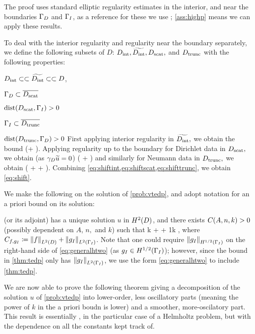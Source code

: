 The proof uses standard elliptic regularity estimates in the interior, and near the boundaries $\Gamma_{D}$ and $\Gamma_{I}$, as a reference for these we use \cite[pp. 137-138]{Mc:00}; \cref{ass:highp} means we can apply these results.

To deal with the interior regularity and regularity near the boundary separately, we define the following subsets of $D$: $D_{\mathrm{int}},\widetilde{D_{\mathrm{int}}},D_{\mathrm{scat}},$ and $D_{\mathrm{trunc}}$ with the following properties:
\bit
\item $D_{\mathrm{int}} \subset\subset \widetilde{D_{\mathrm{int}}} \subset\subset D$,
\item $\Gamma_{D} \subset \overline{D_{\mathrm{scat}}}$
\item $\operatorname{dist}(D_{\mathrm{scat}},\Gamma_{I}) > 0 $
  \item $\Gamma_{I} \subset \overline{D_{\mathrm{trunc}}}$
\item $\operatorname{dist}(D_{\mathrm{trunc}},\Gamma_{D}) > 0 $
    \eit
    First applying interior regularity \cite[Theorem 4.16]{Mc:00} in $\widetilde{D_{\mathrm{int}}},$ we obtain the bound
    \beq\label{eq:shiftint}
\NHlptDint{\utilde} \leq \CintAl \mleft(\NHoDinttilde + \NHlDinttilde{\ftilde}\mright).
\eeq
Applying regularity up to the boundary for Dirichlet data \cite[Theorem 4.18 (i)]{Mc:00} in $D_{\mathrm{scat}},$ we obtain (as $\gamma_{D} \widetilde{u} = 0$)
\beq\label{eq:shiftscat}
\NHlptDscat{\utilde} \leq \CscatAl \mleft(\NHoD{\utilde} + \NHlD{\ftilde}\mright)
\eeq
and similarly for Neumann data \cite[Theorem 4.18 (ii)]{Mc:00} in $D_{\mathrm{trunc}},$ we obtain
\beq\label{eq:shifttrunc}
\NHlptDtrunc{\utilde} \leq \CtruncAl \mleft(\NHoD{\utilde} + \NHlphGI{\dn \utilde} + \NHlD{\ftilde}\mright).
\eeq
Combining \cref{eq:shiftint,eq:shiftscat,eq:shifttrunc}, we obtain \cref{eq:shift}.
\epf

We make the following  on the solution of \cref{prob:vtedp}, and adopt notation for an a priori bound on its solution:

\bas\label{ass:htwo}
 (or its adjoint) has a unique solution $u$ in $\HtD$, and there exists $\CAnk>0$ (possibly dependent on $A$, $n,$ and $k$) such that
\beq\label{eq:generalhtwo}
k  +  + \frac1k  \leq \CAnk \Cfg,
\eeq
where $\Cfg \de \NLtD{f} + \NLtGI{\gI}$.
\eas
Note that one could require $\NHhGI{\gI}$ on the right-hand side of \cref{eq:generalhtwo} (as $\gI \in \HhGI$); however, since the bound in \cref{thm:tedp} only has $\NLtGI{\gI}$, we use the form \cref{eq:generalhtwo} to include \cref{thm:tedp}.

We are now able to prove the following theorem giving a decomposition of the solution $u$ of \cref{prob:vtedp} into lower-order, less oscillatory parts (meaning the power of $k$ in the a priori boudn is lower) and a smoother, more-oscilatory part. This result is essentially \cite[Theorem 1]{ChNi:18a}, in the particular case of a Helmholtz problem, but with the dependence on all the constants kept track of.

